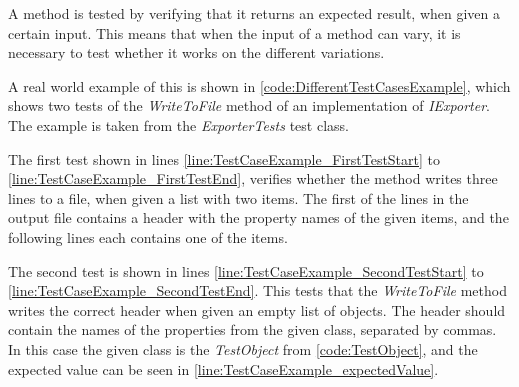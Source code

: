 A method is tested by verifying that it returns an expected result, when given a certain input. This means that when the input of a method can vary, it is necessary to test whether it works on the different variations. 
\par
A real world example of this is shown in \autoref{code:DifferentTestCasesExample}, which shows two tests of the \textit{WriteToFile} method of an implementation of \textit{IExporter}. The example is taken from the \textit{ExporterTests} test class.
\par
The first test shown in lines \ref{line:TestCaseExample_FirstTestStart} to \ref{line:TestCaseExample_FirstTestEnd}, verifies whether the method writes three lines to a file, when given a list with two items. The first of the lines in the output file contains a header with the property names of the given items, and the following lines each contains one of the items.
\par
The second test is shown in lines \ref{line:TestCaseExample_SecondTestStart} to \ref{line:TestCaseExample_SecondTestEnd}. This tests that the \textit{WriteToFile} method writes the correct header when given an empty list of objects. The header should contain the names of the properties from the given class, separated by commas. In this case the given class is the \textit{TestObject} from \autoref{code:TestObject}, and the expected value can be seen in \ref{line:TestCaseExample_expectedValue}.
\par

